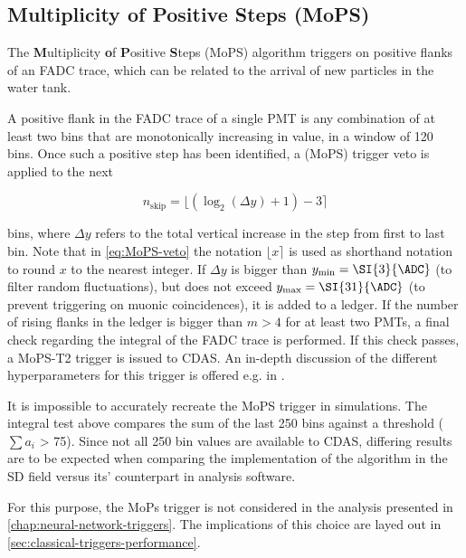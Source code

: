 \subsection{Multiplicity of Positive Steps (MoPS)}
\label{ssec:multiplicity-of-positive-steps}

The \textbf{M}ultiplicity \textbf{o}f \textbf{P}ositive \textbf{S}teps (MoPS) algorithm triggers on positive flanks of an FADC trace, which can be related to the 
arrival of new particles in the water tank. 

A positive flank in the FADC trace of a single PMT is any combination of at least two bins that are monotonically increasing in value, in a window of 120 bins. 
Once such a positive step has been identified, a (MoPS) trigger veto is applied to the next 

\begin{equation}
    \label{eq:MoPS-veto}
    n_\text{skip} = \lfloor \left( \log_2(\Delta y) + 1 \right) - 3\rceil
\end{equation}

bins, where $\Delta y$ refers to the total vertical increase in the step from first to last bin. Note that in \autoref{eq:MoPS-veto} the notation $\lfloor x \rceil$ 
is used as shorthand notation to round $x$ to the nearest integer. If $\Delta y$ is bigger than $y_\text{min} = \SI{3}{\ADC}$ (to filter random fluctuations), but 
does not exceed $y_\text{max} = \SI{31}{\ADC}$ (to prevent triggering on muonic coincidences), it is added to a ledger. If the number of rising flanks in the ledger
is bigger than $m>4$ for at least two PMTs, a final check regarding the integral of the FADC trace is performed. If this check passes, a MoPS-T2 trigger is issued 
to CDAS. An in-depth discussion of the different hyperparameters for this trigger is offered e.g. in \cite{gapMoPS}.

It is impossible to accurately recreate the MoPS trigger in simulations. The integral test above compares the sum of the last 250 bins against a threshold 
($\sum a_i$ > 75). Since not all 250 bin values are available to CDAS, differing results are to be expected when comparing the implementation of the algorithm in 
the SD field versus its' counterpart in analysis software. 

For this purpose, the MoPs trigger is not considered in the analysis presented in \autoref{chap:neural-network-triggers}. The implications of this choice are layed
out in \autoref{sec:classical-triggers-performance}.


